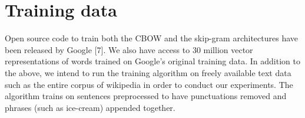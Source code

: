 \section{Training data}\label{sec:train_data}

Open source code to train both the CBOW and the skip-gram architectures have been released by Google [7]. 
We also have access to 30 million vector representations of words trained on Google’s original training data. 
In addition to the above, we intend to run the training algorithm on freely available text data such as the entire corpus of wikipedia in order to conduct our experiments. 
The algorithm trains on sentences preprocessed to have punctuations removed and phrases (such as ice-cream) appended together. 

